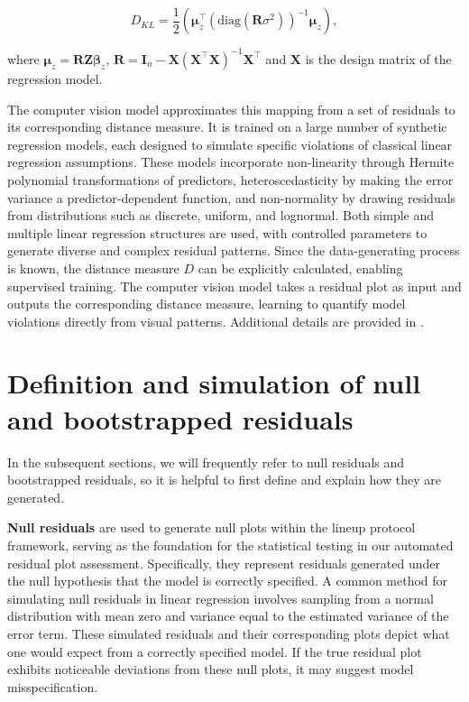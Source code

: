 \documentclass[
doublespace,
  times]{anzsauth}
\begin{document}
\begin{equation*} \label{eq:kl-2}
D_{KL} = \frac{1}{2}\left(\boldsymbol{\mu}_z^\top(\text{diag}(\boldsymbol{R}\sigma^2))^{-1}\boldsymbol{\mu}_z\right),
\end{equation*}

where
\(\boldsymbol{\mu}_z = \boldsymbol{R}\boldsymbol{Z}\boldsymbol{\beta}_z\),
\(\boldsymbol{R} = \boldsymbol{I}_n - \boldsymbol{X}(\boldsymbol{X}^\top\boldsymbol{X})^{-1}\boldsymbol{X}^\top\)
and \(\boldsymbol{X}\) is the design matrix of the regression model.

The computer vision model approximates this mapping from a set of
residuals to its corresponding distance measure. It is trained on a
large number of synthetic regression models, each designed to simulate
specific violations of classical linear regression assumptions. These
models incorporate non-linearity through Hermite polynomial
transformations of predictors, heteroscedasticity by making the error
variance a predictor-dependent function, and non-normality by drawing
residuals from distributions such as discrete, uniform, and lognormal.
Both simple and multiple linear regression structures are used, with
controlled parameters to generate diverse and complex residual patterns.
Since the data-generating process is known, the distance measure \(D\)
can be explicitly calculated, enabling supervised training. The computer
vision model takes a residual plot as input and outputs the
corresponding distance measure, learning to quantify model violations
directly from visual patterns. Additional details are provided in
\citet{li2024automated}.

\section{Definition and simulation of null and bootstrapped
residuals}\label{sec-null-and-boot-desc}

In the subsequent sections, we will frequently refer to null residuals
and bootstrapped residuals, so it is helpful to first define and explain
how they are generated.

\textbf{Null residuals} are used to generate null plots within the
lineup protocol framework, serving as the foundation for the statistical
testing in our automated residual plot assessment. Specifically, they
represent residuals generated under the null hypothesis that the model
is correctly specified. A common method for simulating null residuals in
linear regression involves sampling from a normal distribution with mean
zero and variance equal to the estimated variance of the error term.
These simulated residuals and their corresponding plots depict what one
would expect from a correctly specified model. If the true residual plot
exhibits noticeable deviations from these null plots, it may suggest
model misspecification.
\end{document}
